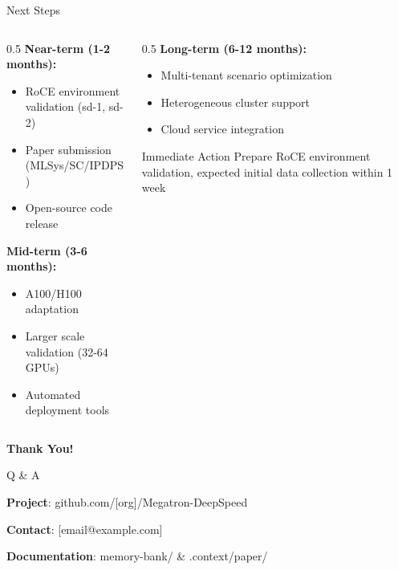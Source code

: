 \documentclass[aspectratio=169,10pt]{beamer}
\begin{document}
\begin{frame}{Next Steps}
\begin{columns}
\begin{column}{0.5\textwidth}
\textbf{Near-term (1-2 months):}
\begin{itemize}
    \item RoCE environment validation (sd-1, sd-2)
    \item Paper submission (MLSys/SC/IPDPS)
    \item Open-source code release
\end{itemize}
\vspace{0.3cm}
\textbf{Mid-term (3-6 months):}
\begin{itemize}
    \item A100/H100 adaptation
    \item Larger scale validation (32-64 GPUs)
    \item Automated deployment tools
\end{itemize}
\end{column}
\begin{column}{0.5\textwidth}
\textbf{Long-term (6-12 months):}
\begin{itemize}
    \item Multi-tenant scenario optimization
    \item Heterogeneous cluster support
    \item Cloud service integration
\end{itemize}
\vspace{0.5cm}
\begin{alertblock}{Immediate Action}
Prepare RoCE environment validation, expected initial data collection within 1 week
\end{alertblock}
\end{column}
\end{columns}
\end{frame}

\begin{frame}
\begin{center}
\Huge \textbf{Thank You!}
\vspace{1cm}

\Large Q \& A
\vspace{1cm}

\normalsize
\textbf{Project}: github.com/[org]/Megatron-DeepSpeed

\textbf{Contact}: [email@example.com]

\textbf{Documentation}: memory-bank/ \& .context/paper/
\end{center}
\end{frame}
\end{document}
